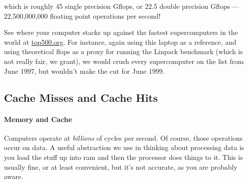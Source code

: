 which is roughly 45 single precision Gflops, or 22.5 double precision Gflops 
--- 22,500,000,000 floating point operations per second!

See where your computer stacks up against the fastest supercomputers in the 
world at \href{http://www.top500.org/}{top500.org}.  For instance, again using 
this laptop as a reference, and using theoretical flops as a proxy for running 
the Linpack benchmark (which is not really fair, we grant), we would crush 
every supercomputer on the list from June 1997, but wouldn't make the cut for 
June 1999.



\subsection{Cache Misses and Cache Hits}

\paragraph{Memory and Cache}

Computers operate at \emph{billions} of cycles per second.  Of course, those  
operations occur on data.  A useful abstraction we use in thinking about 
processing data is you load the stuff up into ram and then the processor does 
things to it.  This is usually fine, or at least convenient, but it's not 
accurate, as you are probably aware.  

